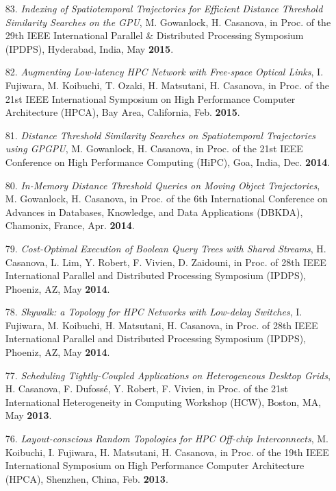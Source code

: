 \begin{enumerate}
\item [83.] {\it Indexing of Spatiotemporal Trajectories for Efficient Distance Threshold Similarity Searches on the GPU}, M. Gowanlock, H. Casanova, 
in Proc. of the 29th IEEE International Parallel \& Distributed Processing Symposium (IPDPS), Hyderabad, India, May {\bf 2015}.


\item [82.] {\it Augmenting Low-latency HPC Network with Free-space Optical Links}, I. Fujiwara, M. Koibuchi, T. Ozaki, H. Matsutani, H. Casanova,
in Proc. of the 21st IEEE International Symposium on High Performance Computer Architecture (HPCA), Bay Area, California, Feb. {\bf 2015}.


\item [81.] {\it Distance Threshold Similarity Searches on Spatiotemporal
Trajectories using GPGPU}, M. Gowanlock, H. Casanova, in Proc. of the 21st
IEEE Conference on High Performance Computing (HiPC), Goa, India,
Dec. {\bf 2014}.

\item [80.] {\it In-Memory Distance Threshold Queries on Moving Object
Trajectories}, M. Gowanlock, H. Casanova, in Proc. of the 6th
International Conference on Advances in Databases, Knowledge, and Data
Applications (DBKDA), Chamonix, France, Apr. {\bf 2014}.

\item [79.] {\it Cost-Optimal Execution of Boolean Query Trees with Shared Streams}, H. Casanova, L. Lim, Y. Robert, F. Vivien, D. Zaidouni, in Proc. of
28th IEEE International Parallel and Distributed Processing Symposium (IPDPS),
Phoeniz, AZ, May {\bf 2014}.

\item [78.] {\it Skywalk: a Topology for HPC Networks with Low-delay Switches}, I. Fujiwara, M. Koibuchi, H. Matsutani, H. Casanova, in Proc. of
28th IEEE International Parallel and Distributed Processing Symposium (IPDPS),
Phoeniz, AZ, May {\bf 2014}.

\item[77.] {\it Scheduling Tightly-Coupled Applications on Heterogeneous Desktop Grids},
H. Casanova, F. Dufoss\'e, Y. Robert, F. Vivien,
in Proc. of 
the 21st International Heterogeneity in Computing Workshop (HCW), Boston, MA, May {\bf 2013}.

\item[76.] {\it Layout-conscious Random Topologies for HPC Off-chip Interconnects}, 
M. Koibuchi, I. Fujiwara, H. Matsutani, H. Casanova,
in Proc. of the 19th IEEE International Symposium on High Performance Computer Architecture (HPCA), Shenzhen, China, Feb. {\bf 2013}.


\end{enumerate}
